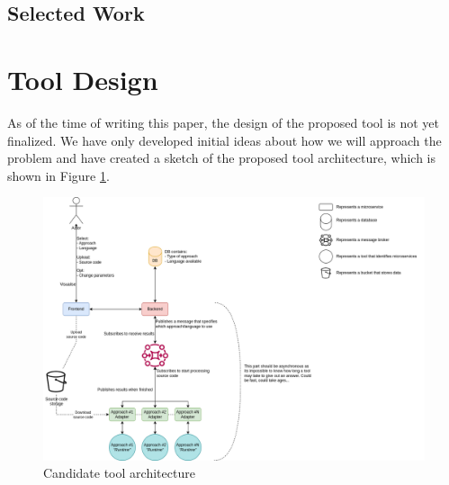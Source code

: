\documentclass[conference]{IEEEtran}
\begin{document}

\subsection{Selected Work}

\section{Tool Design}

As of the time of writing this paper, the design of the proposed tool is not
yet finalized. We have only developed initial ideas about how we will approach
the problem and have created a sketch of the proposed tool architecture, which
is shown in Figure \ref{fig:tool-architecture}.

\begin{figure}[!htb]
  \caption{Candidate tool architecture}
  \label{fig:tool-architecture}
  \centering
  \includegraphics[width=\columnwidth]{thesis-architecture.drawio}
\end{figure}
\end{document}
